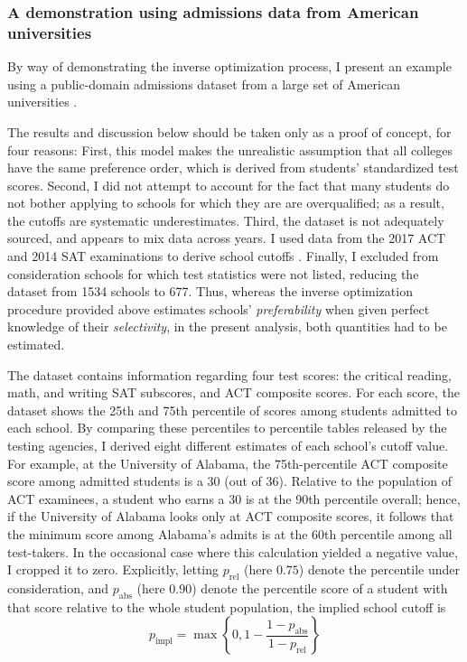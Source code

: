 \documentclass[12pt]{article}
\theoremstyle{definition}
\begin{document}
\subsubsection{A demonstration using admissions data from American universities}
By way of demonstrating the inverse optimization process, I present an example using a public-domain admissions dataset from a large set of American universities \parencite[][]{collegeadmissionskaggle}.

The results and discussion below should be taken only as a proof of concept, for four reasons: First, this model makes the unrealistic assumption that all colleges have the same preference order, which is derived from students' standardized test scores. Second, I did not attempt to account for the fact that many students do not bother applying to schools for which they are are overqualified; as a result, the cutoffs are systematic underestimates. Third, the dataset is not adequately sourced, and appears to mix data across years. I used data from the 2017 ACT and 2014 SAT examinations to derive school cutoffs \parencite[][]{ACTprofilerpt, SATpercentileranks}. Finally, I excluded from consideration schools for which test statistics were not listed, reducing the dataset from 1534 schools to 677. Thus, whereas the inverse optimization procedure provided above estimates schools' \emph{preferability} when given perfect knowledge of their \emph{selectivity}, in the present analysis, both quantities had to be estimated.

The dataset contains information regarding four test scores: the critical reading, math, and writing SAT subscores, and ACT composite scores. For each score, the dataset shows the 25th and 75th percentile of scores among students admitted to each school. By comparing these percentiles to percentile tables released by the testing agencies, I derived eight different estimates of each school's cutoff value. For example, at the University of Alabama, the 75th-percentile ACT composite score among admitted students is a 30 (out of 36). Relative to the population of ACT examinees, a student who earns a 30 is at the 90th percentile overall; hence, if the University of Alabama looks only at ACT composite scores, it follows that the minimum score among Alabama's admits is at the 60th percentile among all test-takers. In the occasional case where this calculation yielded a negative value, I cropped it to zero. Explicitly, letting $p_{\text{rel}}$ (here $0.75$) denote the percentile under consideration, and $p_{\text{abs}}$ (here $0.90$) denote the percentile score of a student with that score relative to the whole student population, the implied school cutoff is \[p_{\text{impl}} = \max\left\{0, 1 - \frac{1 - p_{\text{abs}}}{1- p_{\text{rel}}}\right\}\]
\end{document}

